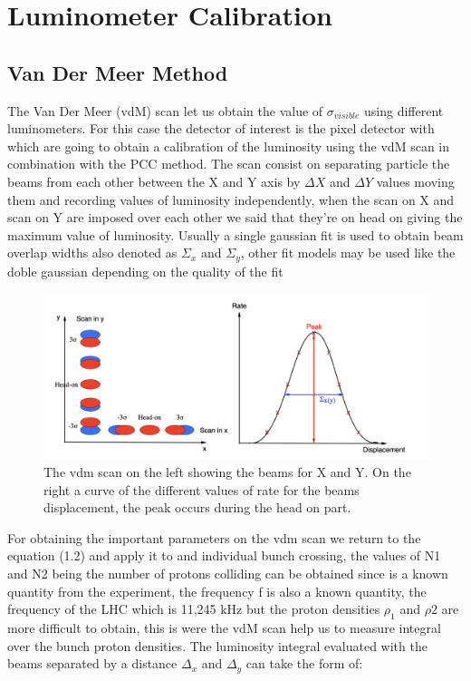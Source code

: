 \chapter{Luminometer Calibration}
\label{ch3}

\section{Van Der Meer Method}

The Van Der Meer (vdM) scan let us obtain the value of $\sigma_{visible}$ using different luminometers. For this case the detector of interest is the pixel detector with which are going to obtain a calibration of the luminosity using the vdM scan in combination with the PCC method. The scan consist on separating particle the beams from each other between the X and Y axis by $\Delta X$ and $\Delta Y$ values moving them and recording values of luminosity independently, when the scan on X and scan on Y are imposed over each other we said that they're on head on giving the maximum value of luminosity. Usually a single gaussian fit is used to obtain beam overlap widths also denoted as $\Sigma_{x}$ and $\Sigma_{y}$, other fit models may be used like the doble gaussian depending on the quality of the fit \cite{Vdm}

\begin{figure}[h]
    \centering
    \includegraphics[width=1\textwidth]{vdm1.png}
    \caption{The vdm scan on the left showing the beams for X and Y. On the right a curve of the different values of rate for the beams displacement, the peak occurs during the head on part.}
    \label{fig:vdm1}
\end{figure}


For obtaining the important parameters on the vdm scan we return to the equation (1.2) and apply it to and individual bunch crossing, the values of N1 and N2 being the number of protons colliding can be obtained since is a known quantity from the experiment, the frequency f is also a known quantity, the frequency of the LHC which is 11,245 kHz but the proton densities $\rho_{1}$ and $\rho{2}$ are more difficult to obtain, this is were the vdM scan help us to measure integral over the bunch proton densities. The luminosity integral evaluated with the beams separated by a distance $\Delta_{x}$ and $\Delta_{y}$ can take the form of: 

